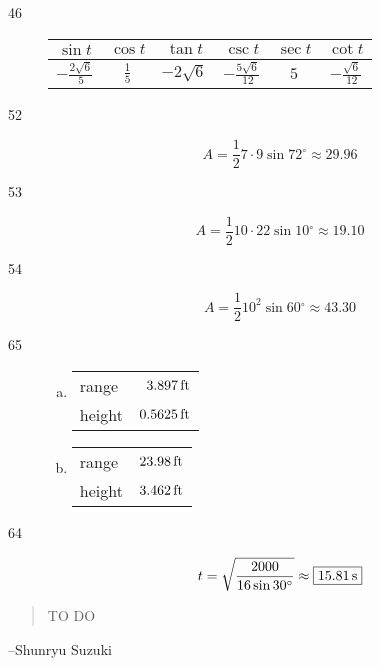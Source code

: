 \documentclass{exam}
\newcommand{\dg}{\ensuremath{^\circ}}
\begin{document}
\begin{description}
      \item[46]
        \begin{tabular}[H]{cccccc}
          \toprule
          $\sin t$                & $\cos t$      & $\tan t$      & $\csc t$                 & $\sec t$ & $\cot t$ \\
          \midrule
          $-\frac{2 \sqrt{6}}{5}$ & $\frac{1}{5}$ & $-2 \sqrt{6}$ & $-\frac{5 \sqrt{6}}{12}$ & $5$      & $-\frac{\sqrt{6}}{12}$ \\
          \bottomrule
        \end{tabular}

      \item[52]
        \[
          A = \frac{1}{2} 7 \cdot 9 \sin 72 \dg \approx \boxed{ 29.96 }
        \]

      \item[53]
        \[
          A = \frac{1}{2} 10 \cdot 22 \sin 10 \dg \approx \boxed{ 19.10 }
        \]

      \item[54]
        \[
          A = \frac{1}{2} 10^2 \sin 60 \dg \approx \boxed{ 43.30 }
        \]

      \item[65]
        \begin{enumerate}[(a)]
          \item 
            \begin{tabular}[H]{lr}
              \toprule
              range  & $\unit[3.897]{ft}$ \\
              height & $\unit[0.5625]{ft}$ \\
              \bottomrule
            \end{tabular}

          \item 
            \begin{tabular}[H]{lr}
              \toprule
              range  & $\unit[23.98]{ft}$ \\
              height & $\unit[3.462]{ft}$ \\
              \bottomrule
            \end{tabular}
        \end{enumerate}

      \item[64]
        \[
          t = \sqrt{ \frac{2000}{16 \sin 30 \dg}} \approx \boxed{ \unit[15.81]{s} }
        \]

    \end{description}

  \else
    \vspace{1 cm}
    \begin{quote}
      \begin{em}
        TO DO
      \end{em}
    \end{quote}
    \hspace{1 cm} --Shunryu Suzuki
  \fi
\end{document}
